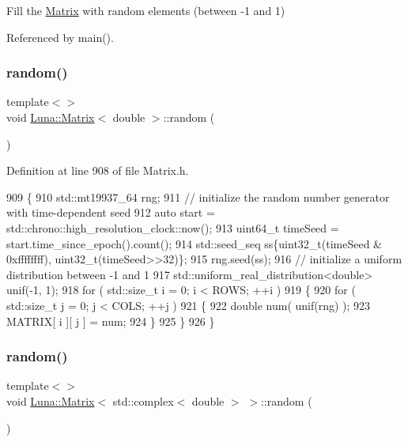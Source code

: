 Fill the \hyperlink{classLuna_1_1Matrix}{Matrix} with random elements (between -\/1 and 1) 



Referenced by main().

\mbox{\label{classLuna_1_1Matrix_ad99fee600adccac9975b0a1d46fa6ca1}} 
\subsubsection{\texorpdfstring{random()}{random()}\hspace{0.1cm}{\footnotesize\ttfamily [2/3]}}
{\footnotesize\ttfamily template$<$$>$ \\
void \hyperlink{classLuna_1_1Matrix}{Luna\+::\+Matrix}$<$ double $>$\+::random (\begin{DoxyParamCaption}{ }\end{DoxyParamCaption})\hspace{0.3cm}{\ttfamily [inline]}}



Definition at line 908 of file Matrix.\+h.


\begin{DoxyCode}
909   \{
910     std::mt19937\_64 rng;
911     \textcolor{comment}{// initialize the random number generator with time-dependent seed}
912     \textcolor{keyword}{auto} start = std::chrono::high\_resolution\_clock::now();
913     uint64\_t timeSeed = start.time\_since\_epoch().count();
914     std::seed\_seq ss\{uint32\_t(timeSeed & 0xffffffff), uint32\_t(timeSeed>>32)\};
915     rng.seed(ss);
916     \textcolor{comment}{// initialize a uniform distribution between -1 and 1}
917     std::uniform\_real\_distribution<double> unif(-1, 1);
918     \textcolor{keywordflow}{for} ( std::size\_t i = 0; i < ROWS; ++i )
919     \{
920       \textcolor{keywordflow}{for} ( std::size\_t j = 0; j < COLS; ++j )
921       \{
922         \textcolor{keywordtype}{double} num( unif(rng) );
923         MATRIX[ i ][ j ] = num;
924       \}
925     \}
926   \}
\end{DoxyCode}
\mbox{\label{classLuna_1_1Matrix_a8f86d10be1cd07f6a61f9ef7a35e0a35}} 
\subsubsection{\texorpdfstring{random()}{random()}\hspace{0.1cm}{\footnotesize\ttfamily [3/3]}}
{\footnotesize\ttfamily template$<$$>$ \\
void \hyperlink{classLuna_1_1Matrix}{Luna\+::\+Matrix}$<$ std\+::complex$<$ double $>$ $>$\+::random (\begin{DoxyParamCaption}{ }\end{DoxyParamCaption})\hspace{0.3cm}{\ttfamily [inline]}}



